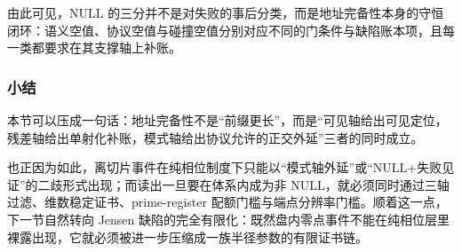 由此可见，\(\mathrm{NULL}\) 的三分并不是对失败的事后分类，而是地址完备性本身的守恒闭环：语义空值、协议空值与碰撞空值分别对应不同的门条件与缺陷账本项，且每一类都要求在其支撑轴上补账。

\subsubsection{小结}\label{subsubsec:typed-address-biaxial-completion-three-axis-summary}
本节可以压成一句话：地址完备性不是“前缀更长”，而是“可见轴给出可见定位，残差轴给出单射化补账，模式轴给出协议允许的正交外延”三者的同时成立。

也正因为如此，离切片事件在纯相位制度下只能以“模式轴外延”或“\(\mathrm{NULL}\)+失败见证”的二歧形式出现；而读出一旦要在体系内成为非 \(\mathrm{NULL}\)，就必须同时通过三轴过滤、维数稳定证书、prime-register 配额门槛与端点分辨率门槛。顺着这一点，下一节自然转向 Jensen 缺陷的完全有限化：既然盘内零点事件不能在纯相位层里裸露出现，它就必须被进一步压缩成一族半径参数的有限证书链。
